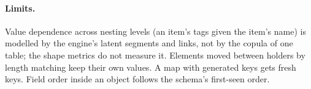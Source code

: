 \paragraph{Limits.} Value dependence across nesting levels (an item's tags given the item's name) is modelled by the
engine's latent segments and links, not by the copula of one table; the shape metrics do not measure it. Elements
moved between holders by length matching keep their own values. A map with generated keys gets fresh keys. Field
order inside an object follows the schema's first-seen order.
\setcounter{proposition}{\value{savedpropdoc}}
